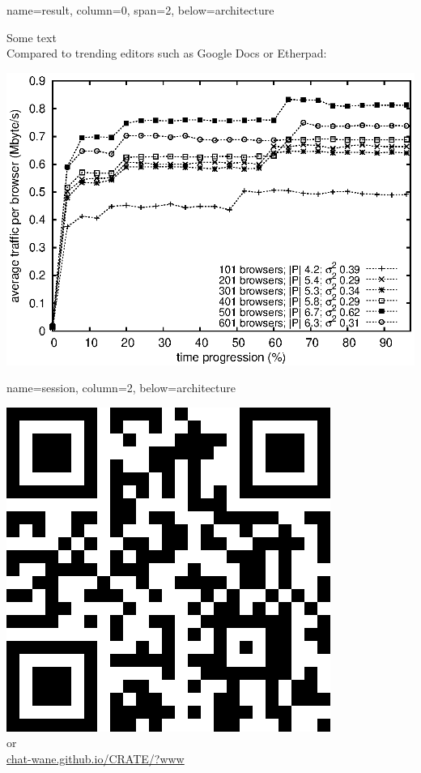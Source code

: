 \documentclass[a1paper, fontscale=0.38, portrait]{baposter}
\begin{document}
\begin{poster}
  {name=result, column=0, span=2, below=architecture}{
    \begin{minipage}[c]{.5\linewidth}
      Some text \\
      Compared to trending editors such as Google Docs or Etherpad:      
    \end{minipage} \hfill
    \begin{minipage}[c]{.5\linewidth}
      \centering
      \includegraphics[scale=0.5]{img/traffic.eps}
    \end{minipage}

  }

  {name=session, column=2, below=architecture} {
    \begin{center}
      \includegraphics[scale=0.25]{img/qrcode.png}
      \\or\\
      \url{chat-wane.github.io/CRATE/?www}
    \end{center}
  }

\end{poster}
\end{document}

